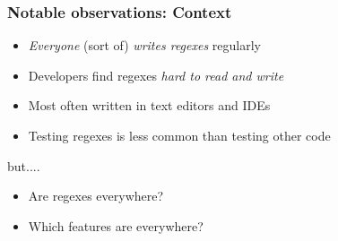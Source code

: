 

\begin{frame}
\frametitle{Notable observations: Context}

\begin{block}{}
\begin{itemize}
	\item {\em Everyone} (sort of) {\em writes regexes} regularly 
	\item Developers find regexes {\em hard to read and write}
	\item Most often written in text editors and IDEs
	\item Testing regexes is {less} common than testing other code
\end{itemize}
\end{block}

but....

\begin{block}{}
\begin{itemize}
\item Are regexes everywhere?
\item Which features are everywhere?
\end{itemize}
\end{block}



\end{frame}









